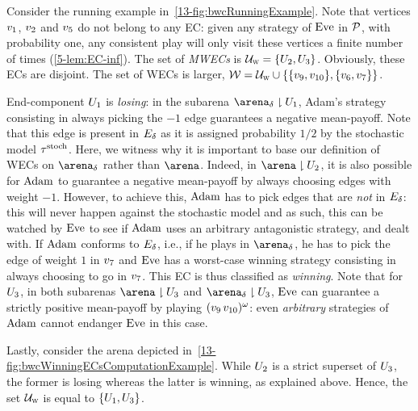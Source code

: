 \begin{example}
Consider the running example in~\cref{13-fig:bwcRunningExample}. Note that vertices $v_{1}$, $v_{2}$ and $v_{5}$ do not belong to any EC: given any strategy of $\text{Eve}$ in ${\mathcal{P}} $, with probability one, any consistent play will only visit these vertices a finite number of times (\cref{5-lem:EC-inf}). The set of \textit{MWECs} is $\mathcal{U}_{\textsc{w}} = \{U_{2}, U_{3}\}$. Obviously, these ECs are disjoint. The set of WECs is larger, $\mathcal{W} = \mathcal{U}_{\textsc{w}} \cup \{\{v_{9}, v_{10}\}, \{v_{6}, v_{7}\}\}$.

End-component $U_{1}$ is \textit{losing}: in the subarena $\gameNonZero \reduc \ec_{1}$, Adam's strategy consisting in always picking the $-1$ edge guarantees a negative mean-payoff. Note that this edge is present in $E_{\delta}$ as it is assigned probability $1/2$ by the stochastic model $\tau^{\text{stoch}} $. Here, we witness why it is important to base our definition of WECs on $\gameNonZero$ rather than $\arena$. Indeed, in $\arena \reduc \ec_{2}$, it is also possible for $\text{Adam}$ to guarantee a negative mean-payoff by always choosing edges with weight $-1$. However, to achieve this, $\text{Adam}$ has to pick edges that are \textit{not} in $E_{\delta}$: this will never happen against the stochastic model and as such, this can be watched by $\text{Eve}$ to see if $\text{Adam}$ uses an arbitrary antagonistic strategy, and dealt with. If $\text{Adam}$ conforms to $E_{\delta}$, i.e., if he plays in $\gameNonZero$, he has to pick the edge of weight $1$ in $v_{7}$ and $\text{Eve}$ has a worst-case winning strategy consisting in always choosing to go in $v_{7}$. This EC is thus classified as \textit{winning}. Note that for $U_{3}$, in both subarenas $\arena \reduc \ec_{3}$ and $\gameNonZero \reduc \ec_{3}$, $\text{Eve}$ can guarantee a strictly positive mean-payoff by playing $(v_{9}\,v_{10})^\omega$: even \textit{arbitrary} strategies of $\text{Adam}$ cannot endanger $\text{Eve}$ in this case.

Lastly, consider the arena depicted in~\cref{13-fig:bwcWinningECsComputationExample}. While $U_{2}$ is a strict superset of $U_{3}$, the former is losing whereas the latter is winning, as explained above. Hence, the set $\mathcal{U}_{\textsc{w}}$ is equal to $\{U_{1}, U_{3}\}$.
\end{example}

